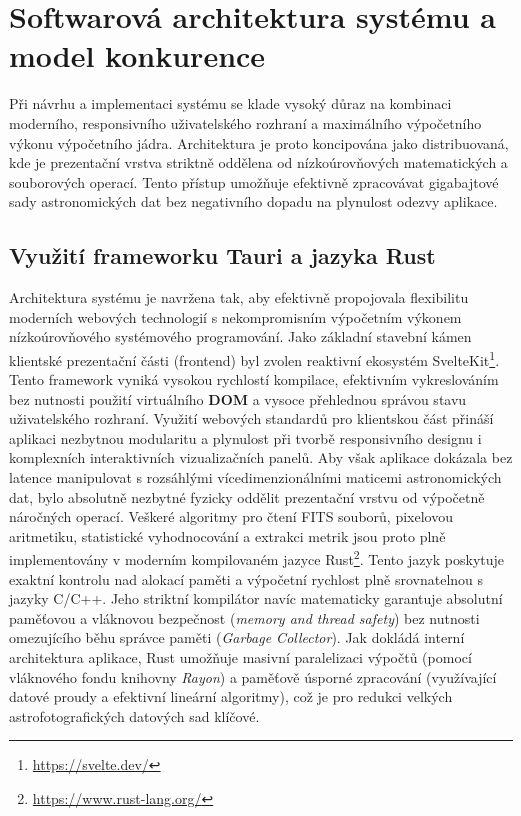 \chapter{Softwarová architektura systému a model konkurence}
\label{ch:architecture}

Při návrhu a implementaci systému se klade vysoký důraz na kombinaci moderního, responsivního uživatelského rozhraní a maximálního výpočetního výkonu výpočetního jádra. Architektura je proto koncipována jako distribuovaná, kde je prezentační vrstva striktně oddělena od nízkoúrovňových matematických a souborových operací. Tento přístup umožňuje efektivně zpracovávat gigabajtové sady astronomických dat bez negativního dopadu na plynulost odezvy aplikace.

\section{Využití frameworku Tauri a jazyka Rust} Architektura systému je navržena tak, aby efektivně propojovala flexibilitu moderních webových technologií s nekompromisním výpočetním výkonem nízkoúrovňového systémového programování. Jako základní stavební kámen klientské prezentační části (frontend) byl zvolen reaktivní ekosystém SvelteKit\footnote{\url{https://svelte.dev/}}. Tento framework vyniká vysokou rychlostí kompilace, efektivním vykreslováním bez nutnosti použití virtuálního \textbf{\ac{DOM}} a vysoce přehlednou správou stavu uživatelského rozhraní. Využití webových standardů pro klientskou část přináší aplikaci nezbytnou modularitu a plynulost při tvorbě responsivního designu i komplexních interaktivních vizualizačních panelů.
Aby však aplikace dokázala bez latence manipulovat s rozsáhlými vícedimenzionálními maticemi astronomických dat, bylo absolutně nezbytné fyzicky oddělit prezentační vrstvu od výpočetně náročných operací. Veškeré algoritmy pro čtení \ac{FITS} souborů, pixelovou aritmetiku, statistické vyhodnocování a extrakci metrik jsou proto plně implementovány v moderním kompilovaném jazyce Rust\footnote{\url{https://www.rust-lang.org/}}. Tento jazyk poskytuje exaktní kontrolu nad alokací paměti a výpočetní rychlost plně srovnatelnou s jazyky C/C++. Jeho striktní kompilátor navíc matematicky garantuje absolutní paměťovou a vláknovou bezpečnost (\textit{memory and thread safety}) bez nutnosti omezujícího běhu správce paměti (\textit{Garbage Collector}). Jak dokládá interní architektura aplikace, Rust umožňuje masivní paralelizaci výpočtů (pomocí vláknového fondu knihovny \textit{Rayon}) a paměťově úsporné zpracování (využívající datové proudy a efektivní lineární algoritmy), což je pro redukci velkých astrofotografických datových sad klíčové.
